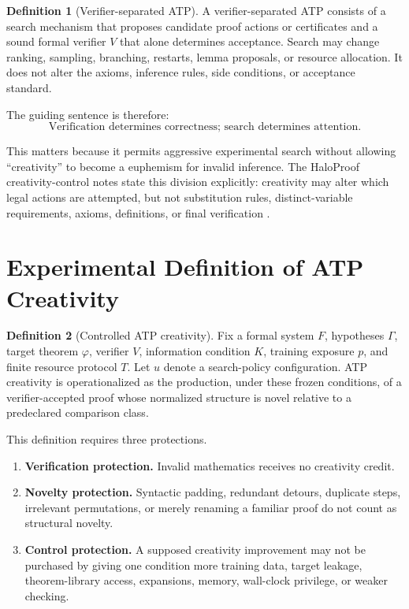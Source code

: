 \documentclass[11pt]{article}
\theoremstyle{datatheorem}
\theoremstyle{definition}
\newtheorem{definition}{Definition}[section]
\begin{document}
\begin{definition}[Verifier-separated ATP]
A verifier-separated ATP consists of a search mechanism that proposes candidate proof actions or certificates and a sound formal verifier $V$ that alone determines acceptance. Search may change ranking, sampling, branching, restarts, lemma proposals, or resource allocation. It does not alter the axioms, inference rules, side conditions, or acceptance standard.
\end{definition}

The guiding sentence is therefore:
\[
\boxed{\text{Verification determines correctness; search determines attention.}}
\]

This matters because it permits aggressive experimental search without allowing ``creativity'' to become a euphemism for invalid inference. The HaloProof creativity-control notes state this division explicitly: creativity may alter which legal actions are attempted, but not substitution rules, distinct-variable requirements, axioms, definitions, or final verification \cite{tennesonHalo}.

\section{Experimental Definition of ATP Creativity}

\begin{definition}[Controlled ATP creativity]
Fix a formal system $F$, hypotheses $\Gamma$, target theorem $\varphi$, verifier $V$, information condition $K$, training exposure $p$, and finite resource protocol $T$. Let $u$ denote a search-policy configuration. ATP creativity is operationalized as the production, under these frozen conditions, of a verifier-accepted proof whose normalized structure is novel relative to a predeclared comparison class.
\end{definition}

This definition requires three protections.

\begin{enumerate}
\item \textbf{Verification protection.} Invalid mathematics receives no creativity credit.
\item \textbf{Novelty protection.} Syntactic padding, redundant detours, duplicate steps, irrelevant permutations, or merely renaming a familiar proof do not count as structural novelty.
\item \textbf{Control protection.} A supposed creativity improvement may not be purchased by giving one condition more training data, target leakage, theorem-library access, expansions, memory, wall-clock privilege, or weaker checking.
\end{enumerate}
\end{document}
